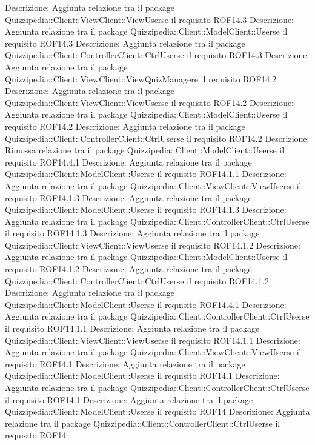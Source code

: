 Descrizione: Aggiunta relazione tra il package Quizzipedia::Client::ViewClient::ViewUserse il requisito ROF14.3 
Descrizione: Aggiunta relazione tra il package Quizzipedia::Client::ModelClient::Userse il requisito ROF14.3 
Descrizione: Aggiunta relazione tra il package Quizzipedia::Client::ControllerClient::CtrlUserse il requisito ROF14.3 
Descrizione: Aggiunta relazione tra il package Quizzipedia::Client::ViewClient::ViewQuizManagere il requisito ROF14.2 
Descrizione: Aggiunta relazione tra il package Quizzipedia::Client::ViewClient::ViewUserse il requisito ROF14.2 
Descrizione: Aggiunta relazione tra il package Quizzipedia::Client::ModelClient::Userse il requisito ROF14.2 
Descrizione: Aggiunta relazione tra il package Quizzipedia::Client::ControllerClient::CtrlUserse il requisito ROF14.2 
Descrizione: Rimossa relazione tra il package Quizzipedia::Client::ModelClient::Userse il requisito ROF14.4.1 
Descrizione: Aggiunta relazione tra il package Quizzipedia::Client::ModelClient::Userse il requisito ROF14.1.1 
Descrizione: Aggiunta relazione tra il package Quizzipedia::Client::ViewClient::ViewUserse il requisito ROF14.1.3 
Descrizione: Aggiunta relazione tra il package Quizzipedia::Client::ModelClient::Userse il requisito ROF14.1.3 
Descrizione: Aggiunta relazione tra il package Quizzipedia::Client::ControllerClient::CtrlUserse il requisito ROF14.1.3 
Descrizione: Aggiunta relazione tra il package Quizzipedia::Client::ViewClient::ViewUserse il requisito ROF14.1.2 
Descrizione: Aggiunta relazione tra il package Quizzipedia::Client::ModelClient::Userse il requisito ROF14.1.2 
Descrizione: Aggiunta relazione tra il package Quizzipedia::Client::ControllerClient::CtrlUserse il requisito ROF14.1.2 
Descrizione: Aggiunta relazione tra il package Quizzipedia::Client::ModelClient::Userse il requisito ROF14.4.1 
Descrizione: Aggiunta relazione tra il package Quizzipedia::Client::ControllerClient::CtrlUserse il requisito ROF14.1.1 
Descrizione: Aggiunta relazione tra il package Quizzipedia::Client::ViewClient::ViewUserse il requisito ROF14.1.1 
Descrizione: Aggiunta relazione tra il package Quizzipedia::Client::ViewClient::ViewUserse il requisito ROF14.1 
Descrizione: Aggiunta relazione tra il package Quizzipedia::Client::ModelClient::Userse il requisito ROF14.1 
Descrizione: Aggiunta relazione tra il package Quizzipedia::Client::ControllerClient::CtrlUserse il requisito ROF14.1 
Descrizione: Aggiunta relazione tra il package Quizzipedia::Client::ModelClient::Userse il requisito ROF14 
Descrizione: Aggiunta relazione tra il package Quizzipedia::Client::ControllerClient::CtrlUserse il requisito ROF14 
